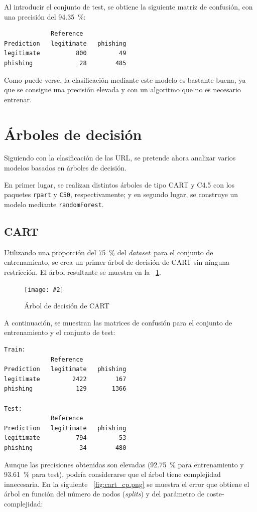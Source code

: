 \documentclass[12pt, a4paper]{article}
\renewcommand{\textit}{\textsl}
\newcommand*{\figref}[1]{\figurename~\ref{fig:#1}}
\newcommand{\figcaption}[4][H]{
  \begin{figure}[#1]
    \centering
    \texttt{[image: \#2]}
    \caption{#3}
    \label{fig:#2}
  \end{figure}
}
\newcommand*{\dataset}{\textit{dataset}}
\begin{document}
    Al introducir el conjunto de test, se obtiene la siguiente matriz de confusión, con una precisión del \SI{94.35}{\percent}:

    \begin{verbatim}
             Reference
Prediction   legitimate   phishing
legitimate          800         49
phishing             28        485
    \end{verbatim}

    Como puede verse, la clasificación mediante este modelo es bastante buena, ya que se consigue una precisión elevada y con un algoritmo que no es necesario entrenar.

  \section{Árboles de decisión}

    Siguiendo con la clasificación de las URL, se pretende ahora analizar varios modelos basados en árboles de decisión.

    En primer lugar, se realizan distintos árboles de tipo CART y C4.5 con los paquetes \texttt{rpart} y \texttt{C50}, respectivamente; y en segundo lugar, se construye un modelo mediante \texttt{randomForest}.

    \subsection{CART}

      Utilizando una proporción del \SI{75}{\percent} del \dataset\ para el conjunto de entrenamiento, se crea un primer árbol de decisión de CART sin ninguna restricción. El árbol resultante se muestra en la \figref{cart.png}.

      \figcaption{cart.png}{Árbol de decisión de CART}{1}

      A continuación, se muestran las matrices de confusión para el conjunto de entrenamiento y el conjunto de test:

      \begin{verbatim}
Train:
             Reference
Prediction   legitimate   phishing
legitimate         2422        167
phishing            129       1366

Test:
             Reference
Prediction   legitimate   phishing
legitimate          794         53
phishing             34        480
      \end{verbatim}

      Aunque las precisiones obtenidas son elevadas (\SI{92.75}{\percent} para entrenamiento y \SI{93.61}{\percent} para test), podría considerarse que el árbol tiene complejidad innecesaria. En la siguiente \figref{cart_cp.png} se muestra el error que obtiene el árbol en función del número de nodos (\textit{splits}) y del parámetro de coste-complejidad:
\end{document}
